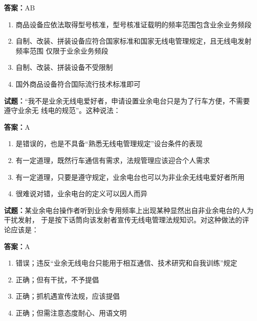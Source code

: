 \documentclass{ctexbook}
\begin{document}
\textbf{答案：}AB 

\begin{enumerate}[leftmargin=3em]
  \item 商品设备应依法取得型号核准，型号核准证载明的频率范围包含业余业务频段 

  \item 自制、改装、拼装设备应符合国家标准和国家无线电管理规定，且无线电发射频率范围
仅限于业余业务频段 

  \item 自制、改装、拼装设备不受限制 

  \item 国外商品设备符合国际流行技术标准即可 

\end{enumerate}





\vspace{1em}

\textbf{试题：}“我不是业余无线电爱好者，申请设置业余电台只是为了行车方便，不需要遵守业余无
线电的规范”。这种说法： 

\textbf{答案：}A 

\begin{enumerate}[leftmargin=3em]
  \item 是错误的，也是不具备“熟悉无线电管理规定”设台条件的表现 

  \item 有一定道理，既然行车通信有需求，法规管理应该迎合个人需求 

  \item 有一定道理，只要是遵守规定，业余电台也可以为非业余无线电爱好者所用 

  \item 很难说对错，业余电台的定义可以因人而异 

\end{enumerate}





\vspace{1em}

\textbf{试题：}某业余电台操作者听到业余专用频率上出现某种显然出自非业余电台的人为干扰发射，
于是按下话筒向该发射者宣传无线电管理法规知识。对这种做法的评论应该是： 

\textbf{答案：}A 

\begin{enumerate}[leftmargin=3em]
  \item 错误；违反“业余无线电台只能用于相互通信、技术研究和自我训练”规定 

  \item 正确；但有干扰，不予提倡 

  \item 正确；抓机遇宣传法规，应该提倡 

  \item 正确；但需注意态度耐心、用语文明 

\end{enumerate}
\end{document}

